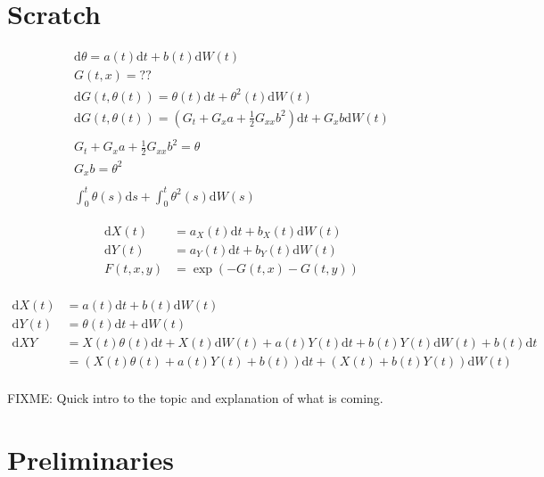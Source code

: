 \documentclass[a4paper]{article}
\begin{document}
\section*{Scratch}

\begin{align*}
  \mathrm{d}\theta = a(t) \mathrm{d}t + b(t) \mathrm{d}W(t)\\
  G(t,x) = ??\\
  \mathrm{d}G(t,\theta(t)) = \theta(t) \mathrm{d}t + \theta^2(t) \mathrm{d}W(t)\\
  \mathrm{d}G(t,\theta(t)) = (G_t + G_x a + \frac{1}{2} G_{xx} b^2) \mathrm{d}t + G_x b \mathrm{d}W(t)\\
  \\
  G_t + G_x a + \frac{1}{2} G_{xx} b^2 = \theta\\
  G_x b = \theta^2\\
  \\
  \int_0^t \theta(s) \mathrm{d}s + \int_0^t \theta^2(s) \mathrm{d}W(s)
\end{align*}

\begin{align*}
  \mathrm{d}X(t) &= a_X(t) \mathrm{d}t + b_X(t) \mathrm{d}W(t)\\
  \mathrm{d}Y(t) &= a_Y(t) \mathrm{d}t + b_Y(t) \mathrm{d}W(t)\\
  F(t,x,y) &= \exp ( -G(t,x) - G(t,y) )\\
\end{align*}

\begin{align*}
  \mathrm{d}X(t) &= a(t) \mathrm{d}t + b(t) \mathrm{d}W(t)\\
  \mathrm{d}Y(t) &= \theta(t) \mathrm{d}t + \mathrm{d}W(t)\\
  \mathrm{d}XY &= X(t) \theta(t) \mathrm{d}t + X(t) \mathrm{d}W(t) + a(t) Y(t) \mathrm{d}t + b(t) Y(t) \mathrm{d}W(t) + b(t) \mathrm{d}t\\
  &= \left(X(t) \theta(t) + a(t) Y(t) + b(t) \right) \mathrm{d}t + \left(X(t) + b(t) Y(t) \right) \mathrm{d}W(t)\\
\end{align*}

\pagebreak

FIXME: Quick intro to the topic and explanation of what is coming.

\section{Preliminaries}
\end{document}

